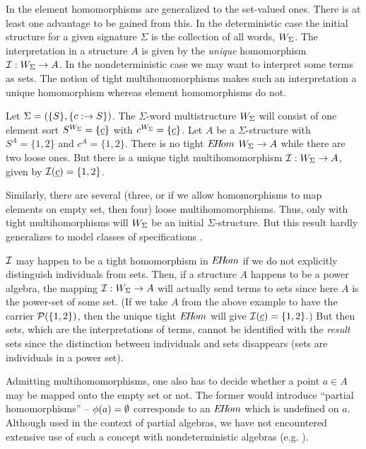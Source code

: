 In \cite{c:58, c:59} the element homomorphisms are generalized to the set-valued
ones. There is at least one advantage to be gained from this. In the
deterministic case the initial structure for a given signature
$\Sigma$ is the collection of all words, $W_{\Sigma}$. The interpretation
in a structure $A$ is given by the {\em unique} homomorphism
${\cal I}:W_{\Sigma}\mathrel{\rightarrow} A$.  In the nondeterministic case we may want to
interpret some terms as sets. The notion of tight multihomomorphisms
makes such an interpretation a unique homomorphism whereas element
homomorphisms do not.
\begin{Example}\label{ex:noinit}
Let $\Sigma=(\{S\},\{c:\mathrel{\rightarrow} S\})$. The $\Sigma$-word multistructure
$W_{\Sigma}$ will consist of one element sort $S^{W_{\Sigma}}=\{\underline{c}\}$ with
$c^{W_{\Sigma}} = \{\underline{c}\}$. Let $A$ be a $\Sigma$-structure with
$S^A=\{1,2\}$ and $c^A=\{1,2\}$. There is no tight $E\!H\!om$
$W_{\Sigma}\mathrel{\rightarrow} A$ while there are two loose ones.  
 But there is a unique
tight multihomomorphism ${\cal I}:W_{\Sigma}\mathrel{\rightarrow} A$, given by ${\cal I}(\underline{c})=\{1,2\}$.
\end{Example}
Similarly, there are several (three, or if we allow homomorphisms to
map elements on empty set, then four) loose multihomomorphisms.  Thus,
only with tight multihomorphisms will $W_{\Sigma}$ be an initial
$\Sigma$-structure. But this result hardly generalizes to model
classes of specifications \cite{c:59, c:128}.

${\cal I}$ may happen to be a tight homomorphism in $E\!H\!om$ if we do not
explicitly distinguish individuals from sets. Then, if a structure $A$
happens to be a power algebra, the mapping ${\cal I}:W_{\Sigma}\mathrel{\rightarrow} A$ will actually
send terms to sets since here $A$ is the power-set of some set.
(If we take $A$ from the above example to have the carrier
${\cal P}(\{1,2\})$, then the unique tight $E\!H\!om$ will give ${\cal I}(\underline{c})=\{1,2\}.$)
 But
then sets, which are the interpretations of terms, cannot be
identified with the {\em result} sets since the distinction between
individuals and sets disappears (sets are individuals in a power set).

Admitting multihomomorphisms, one also has to decide whether a point
$a\in A$ may be mapped onto the empty set or not. The former would
introduce ``partial homomorphisms'' -- $\phi(a)=\emptyset$ corresponds to 
an $E\!H\!om$ which is undefined on $a$. Although used in the context
of partial algebras, we have not encountered extensive use of such a
concept with nondeterministic algebras (e.g. \cite{c:21, c:93}).

